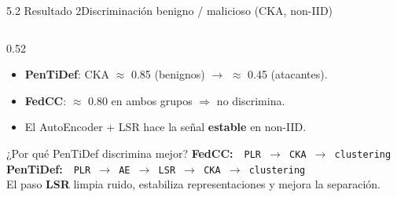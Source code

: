 \begin{frame}{5.2 Resultado 2}{Discriminación benigno / malicioso (CKA, non-IID)}
\begin{columns}[T]
    \begin{column}{0.52\textwidth}
      \begin{itemize}\small
        \item \textbf{PenTiDef}: CKA $\approx$ 0.85 (benignos) $\to$ $\approx$ 0.45 (atacantes).
        \item \textbf{FedCC}: $\approx$ 0.80 en ambos grupos $\Rightarrow$ no discrimina.
        \item El AutoEncoder + LSR hace la señal \textbf{estable} en non-IID.
      \end{itemize}
      \vfill
      \begin{exampleblock}{¿Por qué PenTiDef discrimina mejor?}
        \scriptsize
        \textbf{FedCC:}\ \ \texttt{PLR $\to$ CKA $\to$ clustering}\\[0.2em]
        \textbf{PenTiDef:}\ \ \texttt{PLR $\to$ AE $\to$ \textcolor{UMUblue}{LSR} $\to$ CKA $\to$ clustering}\\[0.3em]
        El paso \textbf{LSR} limpia ruido, estabiliza representaciones y mejora la separación.
      \end{exampleblock}
    \end{column}
  \end{columns}
\end{frame}

